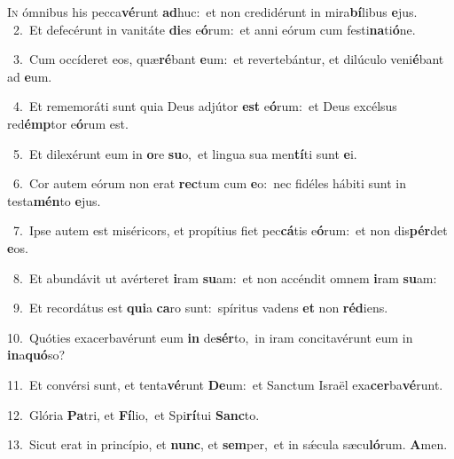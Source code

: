 \lettrine{\initial\textcolor{\initialcolor}{I}}{n} ómnibus his pecca\-\textbf{vé}\-runt \textbf{ad}\-huc:~\star et non credidérunt in mira\-\textbf{bí}\-libus \textbf{e}\-jus.\\
{\numbfont\textcolor{\numbcolor}{~2.}}~Et defecérunt in vanitáte \textbf{di}\-es e\-\textbf{ó}\-rum:~\star et anni eórum cum festi\-\textbf{na}\-ti\-\textbf{ó}\-ne.\par
{\numbfont\textcolor{\numbcolor}{~3.}}~Cum occíderet eos, quæ\-\textbf{ré}\-bant \textbf{e}\-um:~\star et revertebántur, et dilúculo veni\-\textbf{é}\-bant ad \textbf{e}\-um.\par
{\numbfont\textcolor{\numbcolor}{~4.}}~Et rememoráti sunt quia Deus adjútor \textbf{est} e\-\textbf{ó}\-rum:~\star et Deus excélsus red\-\textbf{émp}\-tor e\-\textbf{ó}\-rum est.\par
{\numbfont\textcolor{\numbcolor}{~5.}}~Et dilexérunt eum in \textbf{o}\-re \textbf{su}\-o,~\star et lingua sua men\-\textbf{tí}\-ti sunt \textbf{e}\-i.\par
{\numbfont\textcolor{\numbcolor}{~6.}}~Cor autem eórum non erat \textbf{rec}\-tum cum \textbf{e}\-o:~\star nec fidéles hábiti sunt in testa\-\textbf{mén}\-to \textbf{e}\-jus.\par
{\numbfont\textcolor{\numbcolor}{~7.}}~Ipse autem est miséricors, et propítius fiet pec\-\textbf{cá}\-tis e\-\textbf{ó}\-rum:~\star et non dis\-\textbf{pér}\-det \textbf{e}\-os.\par
{\numbfont\textcolor{\numbcolor}{~8.}}~Et abundávit ut avérteret \textbf{i}\-ram \textbf{su}\-am:~\star et non accéndit omnem \textbf{i}\-ram \textbf{su}\-am:\par
{\numbfont\textcolor{\numbcolor}{~9.}}~Et recordátus est \textbf{qui}\-a \textbf{ca}\-ro sunt:~\star spíritus vadens \textbf{et} non \textbf{réd}\-iens.\par
{\numbfont\textcolor{\numbcolor}{10.}}~Quóties exacerbavérunt eum \textbf{in} de\-\textbf{sér}\-to,~\star in iram concitavérunt eum in \textbf{in}\-a\-\textbf{quó}\-so?\par
{\numbfont\textcolor{\numbcolor}{11.}}~Et convérsi sunt, et tenta\-\textbf{vé}\-runt \textbf{De}\-um:~\star et Sanctum Israël exa\-\textbf{cer}\-ba\-\textbf{vé}\-runt.\par
{\numbfont\textcolor{\numbcolor}{12.}}~Glória \textbf{Pa}\-tri, et \textbf{Fí}\-lio,~\star et Spi\-\textbf{rí}\-tui \textbf{Sanc}\-to.\par
{\numbfont\textcolor{\numbcolor}{13.}}~Sicut erat in princípio, et \textbf{nunc}\-, et \textbf{sem}\-per,~\star et in sǽcula sæcu\-\textbf{ló}\-rum. \textbf{A}\-men.\par
